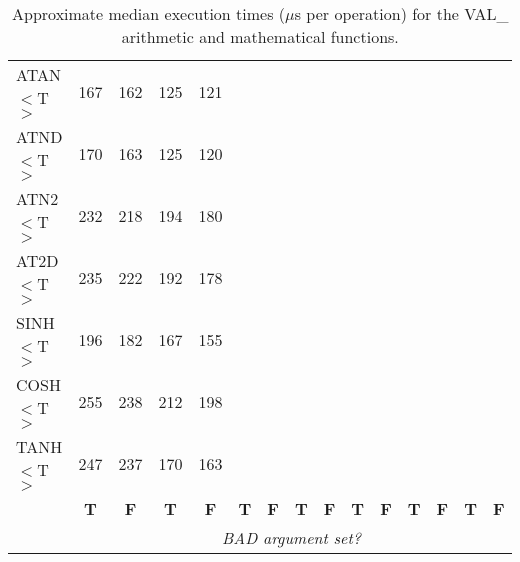 \documentclass[11pt,nolof]{starlink}
\providecommand{\name}[1]{\mbox{#1}}
\begin{document}
\begin{table}[h]
\begin{center}
\begin{scriptsize}
\begin{tabular}{|l|r|r||r|r||r|r||r|r||r|r||r|r||r|r|}
ATAN$<$T$>$ &  167 &  162 &  125 &  121 &      &      &      &      &      &      &      &      &      &      \\
ATND$<$T$>$ &  170 &  163 &  125 &  120 &      &      &      &      &      &      &      &      &      &      \\
ATN2$<$T$>$ &  232 &  218 &  194 &  180 &      &      &      &      &      &      &      &      &      &      \\
AT2D$<$T$>$ &  235 &  222 &  192 &  178 &      &      &      &      &      &      &      &      &      &      \\
SINH$<$T$>$ &  196 &  182 &  167 &  155 &      &      &      &      &      &      &      &      &      &      \\
COSH$<$T$>$ &  255 &  238 &  212 &  198 &      &      &      &      &      &      &      &      &      &      \\
TANH$<$T$>$ &  247 &  237 &  170 &  163 &      &      &      &      &      &      &      &      &      &      \\
\hline
\multicolumn{1}{c}{} &
\multicolumn{1}{|c}{\textbf{T}} & \multicolumn{1}{|c||}{\textbf{F}} &
\multicolumn{1}{c}{\textbf{T}} & \multicolumn{1}{|c||}{\textbf{F}} &
\multicolumn{1}{c}{\textbf{T}} & \multicolumn{1}{|c||}{\textbf{F}} &
\multicolumn{1}{c}{\textbf{T}} & \multicolumn{1}{|c||}{\textbf{F}} &
\multicolumn{1}{c}{\textbf{T}} & \multicolumn{1}{|c||}{\textbf{F}} &
\multicolumn{1}{c}{\textbf{T}} & \multicolumn{1}{|c||}{\textbf{F}} &
\multicolumn{1}{c}{\textbf{T}} & \multicolumn{1}{|c|}{\textbf{F}}\\
\cline{2-15}
\multicolumn{1}{c}{} &
\multicolumn{14}{|c|}{\emph{BAD argument set?}}\\
\cline{2-15}
\end{tabular}
\end{scriptsize}
\caption{Approximate median execution times ($\mu$s per operation) for the
\name{VAL\_} arithmetic and mathematical functions.}
\label{table:valstats}
\end{center}
\end{table}

\newpage
\end{document}
